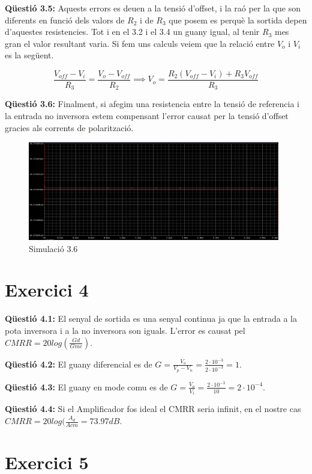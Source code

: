 \documentclass[12pt, a4papre]{article}
\begin{document}
	\textbf{Qüestió 3.5:} Aquests errors es deuen a la tensió d'offset, i la raó per la que son diferents en funció dels valors de $R_2$ i de $R_3$ que posem es perquè la sortida depen d'aquestes resistencies. Tot i en el 3.2 i el 3.4 un guany igual, al tenir $R_3$ mes gran el valor resultant varia. Si fem uns calculs veiem que la relació entre $V_o$ i $V_i$ es la següent.
	
	\[
		\frac{V_{off} - V_i}{R_3} = \frac{V_{o} - V_{off}}{R_2} \implies V_o = \frac{R_2(V_{off} - V_i) + R_3V_{off}}{R_3}
	\]
	
	\textbf{Qüestió 3.6:} Finalment, si afegim una resistencia entre la tensió de referencia i la entrada no inversora estem compensant l'error causat per la tensió d'offset gracies als corrents de polarització.
	
	\begin{figure}[H]
		\begin{center}
		\includegraphics[width=110mm]{Capture_3.6.PNG}
		\caption{Simulació 3.6}
		\end{center}
	\end{figure}
	
	\section{Exercici 4} 
	
	\textbf{Qüestió 4.1:} El senyal de sortida es una senyal continua ja que la entrada a la pota inversora i a la no inversora son iguals. L'error es causat pel $CMRR = 20log(\frac{Gd}{Gmc})$.
	
	\textbf{Qüestió 4.2:} El guany diferencial es de $G = \frac{V_o}{V_p - V_n} = \frac{2\cdot 10^{-3}}{2\cdot 10^{-3}} = 1$.
	
	\textbf{Qüestió 4.3:} El guany en mode comu es de $G = \frac{V_o}{V_i} = \frac{2\cdot 10^{-3}}{10} = 2\cdot 10^{-4}$.
	
	\textbf{Qüestió 4.4:} Si el Amplificador fos ideal el CMRR seria infinit, en el nostre cas $CMRR = 20log(\frac{A_d}{Acm} = 73.97dB$.
	
	\section{Exercici 5} 
	
\end{document}
